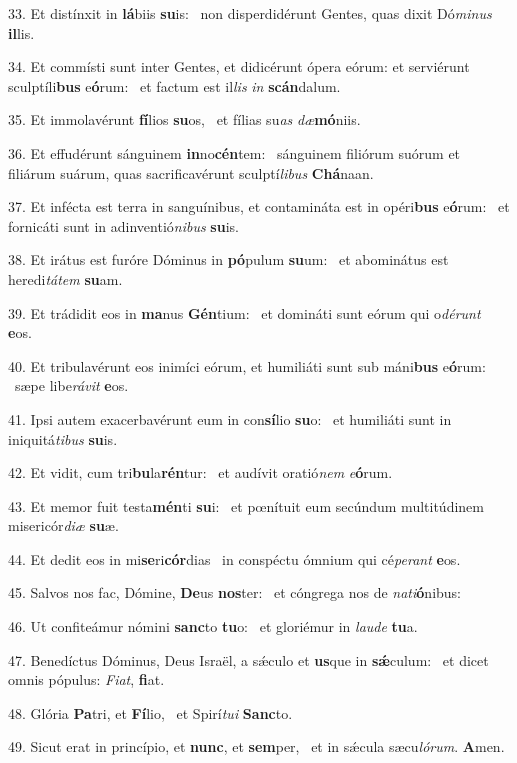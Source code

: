 33. Et distínxit in \textbf{lá}biis \textbf{su}is: \ast\  non disperdidérunt Gentes, quas dixit Dó\textit{mi}\textit{nus} \textbf{il}lis.\

34. Et commísti sunt inter Gentes, et didicérunt ópera eórum: et serviérunt sculptíli\textbf{bus} e\textbf{ó}rum: \ast\  et factum est il\textit{lis} \textit{in} \textbf{scán}dalum.\

35. Et immolavérunt \textbf{fí}lios \textbf{su}os, \ast\  et fílias su\textit{as} \textit{dæ}\textbf{mó}niis.\

36. Et effudérunt sánguinem \textbf{in}no\textbf{cén}tem: \ast\  sánguinem filiórum suórum et filiárum suárum, quas sacrificavérunt sculptí\textit{li}\textit{bus} \textbf{Chá}naan.\

37. Et infécta est terra in sanguínibus, et contamináta est in opéri\textbf{bus} e\textbf{ó}rum: \ast\  et fornicáti sunt in adinventió\textit{ni}\textit{bus} \textbf{su}is.\

38. Et irátus est furóre Dóminus in \textbf{pó}pulum \textbf{su}um: \ast\  et abominátus est heredi\textit{tá}\textit{tem} \textbf{su}am.\

39. Et trádidit eos in \textbf{ma}nus \textbf{Gén}tium: \ast\  et domináti sunt eórum qui o\textit{dé}\textit{runt} \textbf{e}os.\

40. Et tribulavérunt eos inimíci eórum, et humiliáti sunt sub máni\textbf{bus} e\textbf{ó}rum: \ast\  sæpe libe\textit{rá}\textit{vit} \textbf{e}os.\

41. Ipsi autem exacerbavérunt eum in con\textbf{sí}lio \textbf{su}o: \ast\  et humiliáti sunt in iniquitá\textit{ti}\textit{bus} \textbf{su}is.\

42. Et vidit, cum tri\textbf{bu}la\textbf{rén}tur: \ast\  et audívit oratió\textit{nem} \textit{e}\textbf{ó}rum.\

43. Et memor fuit testa\textbf{mén}ti \textbf{su}i: \ast\  et pœnítuit eum secúndum multitúdinem misericór\textit{di}\textit{æ} \textbf{su}æ.\

44. Et dedit eos in mi\textbf{se}ri\textbf{cór}dias \ast\  in conspéctu ómnium qui cé\textit{pe}\textit{rant} \textbf{e}os.\

45. Salvos nos fac, Dómine, \textbf{De}us \textbf{nos}ter: \ast\  et cóngrega nos de \textit{na}\textit{ti}\textbf{ó}nibus:\

46. Ut confiteámur nómini \textbf{sanc}to \textbf{tu}o: \ast\  et gloriémur in \textit{lau}\textit{de} \textbf{tu}a.\

47. Benedíctus Dóminus, Deus Israël, a sǽculo et \textbf{us}que in \textbf{sǽ}culum: \ast\  et dicet omnis pópulus: \textit{Fi}\textit{at}, \textbf{fi}at.\

48. Glória \textbf{Pa}tri, et \textbf{Fí}lio, \ast\  et Spirí\textit{tu}\textit{i} \textbf{Sanc}to.\

49. Sicut erat in princípio, et \textbf{nunc}, et \textbf{sem}per, \ast\  et in sǽcula sæcu\textit{ló}\textit{rum}. \textbf{A}men.\

